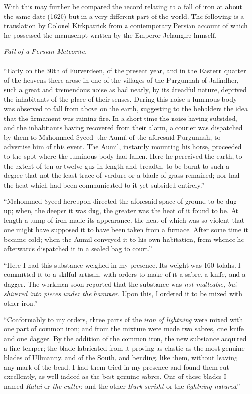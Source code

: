 \documentclass[a4paper, 12pt, oneside]{article}
\begin{document}
With this may further be compared the record relating to a fall of iron at about the same date (1620) but in a very different part of the world. The following is a translation by Colonel Kirkpatrick from a contemporary Persian account of which he possessed the manuscript written by the Emperor Jehangire himself. 
\begin{center}
\emph{Fall of a Persian Meteorite.}
\end{center}
\paragraph{}
``Early on the 30th of Furverdeen, of the present year, and in the Eastern quarter of the heavens there arose in one of the villages of the Purgunnah of Jalindher, such a great and tremendous noise as had nearly, by its dreadful nature, deprived the inhabitants of the place of their senses. During this noise a luminous body was observed to fall from above on the earth, suggesting to the beholders the idea that the firmament was raining fire. In a short time the noise having subsided, and the inhabitants having recovered from their alarm, a courier was dispatched by them to Mahommed Syeed, the Aumil of the aforesaid Purgunnah, to advertise him of this event. The Aumil, instantly mounting his horse, proceeded to the spot where the luminous body had fallen. Here he perceived the earth, to the extent of ten or twelve guz in length and breadth, to be burnt to such a degree that not the least trace of verdure or a blade of grass remained; nor had the heat which had been communicated to it yet subsided entirely.''

``Mahommed Syeed hereupon directed the aforesaid space of ground to be dug up; when, the deeper it was dug, the greater was the heat of it found to be. At length a lump of iron made its appearance, the heat of which was so violent that one might have supposed it to have been taken from a furnace. After some time it became cold; when the Aumil conveyed it to his own habitation, from whence he afterwards dispatched it in a sealed bag to court.''

``Here I had this substance weighed in my presence. Its weight was 160 tolahs. I committed it to a skilful artisan, with orders to make of it a sabre, a knife, and a dagger. The workmen soon reported that the substance was \emph{not malleable, but shivered into pieces under the hammer}. Upon this, I ordered it to be mixed with other iron.''

``Conformably to my orders, three parts of the \emph{iron of lightning} were mixed with one part of common iron; and from the mixture were made two sabres, one knife and one dagger. By the addition of the common iron, the new substance acquired a fine temper; the blade fabricated from it proving as elastic as the most genuine blades of Ullmanny, and of the South, and bending, like them, without leaving any mark of the bend. I had them tried in my presence and found them cut excellently, as well indeed as the best genuine sabres. One of these blades I named \emph{Katai} or \emph{the cutter}; and the other \emph{Burk-serisht} or the \emph{lightning natured}.'' 
\end{document}
